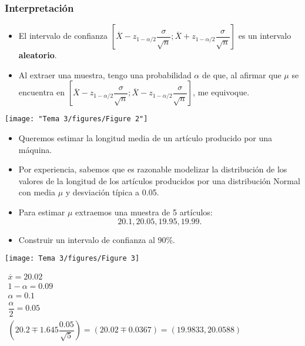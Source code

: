 \subsubsection{Interpretación}
\begin{tcolorbox}[colback=red!5!white, colframe=red!75!black, title=\textbf{Importante}]
\begin{itemize}[label=\textbullet]
    \item El intervalo de confianza $\left[ \overline{X}-z_{1-\alpha /2}\dfrac{\sigma}{\sqrt{n} };\overline{X}+z_{1-\alpha /2}\dfrac{\sigma}{\sqrt{n} } \right] $ es un intervalo \textbf{aleatorio}.
    \item Al extraer una muestra, tengo una probabilidad $\alpha$ de que, al afirmar que $\mu$ se encuentra en $\left[ \overline{X}-z_{1-\alpha / 2}\dfrac{\sigma}{\sqrt{n} };\overline{X}-z_{1-\alpha /2}\dfrac{\sigma}{\sqrt{n} } \right] $, me equivoque.
\end{itemize}
\end{tcolorbox}
\begin{center}
    \texttt{[image: "Tema 3/figures/Figure 2"]}
\end{center}


\begin{itemize}[label=\textbullet]
    \item Queremos estimar la longitud media de un artículo producido por una máquina.
    \item Por experiencia, sabemos que es razonable modelizar la distribución de los valores de la longitud de los artículos producidos por una distribución Normal con media $\mu$ y desviación típica a 0.05.
    \item Para estimar $\mu$ extraemos una muestra de 5 artículos: \[
    20.1,20.05,19.95,19.99.
    \]
\item Construir un intervalo de confianza al 90\%.
\end{itemize}
\begin{minipage}{0.45\textwidth}
    \texttt{[image: Tema 3/figures/Figure 3]}
\end{minipage}
$\begin{array}{l}
    \overline{x}=20.02\\
1-\alpha=0.09\\
\alpha=0.1\\
\dfrac{\alpha}{2}=0.05\\
\left(20.2\mp 1.645 \dfrac{0.05}{\sqrt{5} }\right)=(20.02\mp 0.0367) = (19.9833, 20.0588)
\end{array}$

